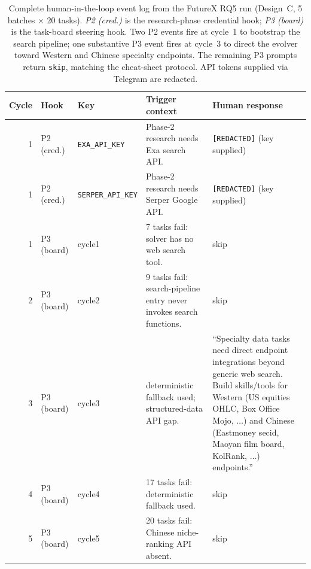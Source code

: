 \begin{table}[t]
\centering\footnotesize
\setlength{\tabcolsep}{4pt}
\caption{Complete human-in-the-loop event log from the FutureX RQ5 run (Design~C, 5 batches $\times$ 20 tasks). \emph{P2 (cred.)} is the research-phase credential hook; \emph{P3 (board)} is the task-board steering hook. Two P2 events fire at cycle~1 to bootstrap the search pipeline; one substantive P3 event fires at cycle~3 to direct the evolver toward Western and Chinese specialty endpoints. The remaining P3 prompts return \texttt{skip}, matching the cheat-sheet protocol. API tokens supplied via Telegram are redacted.}
\label{tab:hitl_log}
\renewcommand{\arraystretch}{1.15}
\begin{tabular}{@{}rllp{}p{}@{}}
\toprule
Cycle & Hook & Key & Trigger context & Human response \\
\midrule
1 & P2 (cred.) & \texttt{EXA\_API\_KEY} & Phase-2 research needs Exa search API. & \texttt{[REDACTED]} (key supplied) \\
1 & P2 (cred.) & \texttt{SERPER\_API\_KEY} & Phase-2 research needs Serper Google API. & \texttt{[REDACTED]} (key supplied) \\
1 & P3 (board) & cycle1 & 7 tasks fail: solver has no web search tool. & skip \\
2 & P3 (board) & cycle2 & 9 tasks fail: search-pipeline entry never invokes search functions. & skip \\
3 & P3 (board) & cycle3 & deterministic fallback used; structured-data API gap. & ``Specialty data tasks need direct endpoint integrations beyond generic web search. Build skills/tools for Western (US equities OHLC, Box Office Mojo, $\ldots$) and Chinese (Eastmoney secid, Maoyan film board, KolRank, $\ldots$) endpoints.'' \\
4 & P3 (board) & cycle4 & 17 tasks fail: deterministic fallback used. & skip \\
5 & P3 (board) & cycle5 & 20 tasks fail: Chinese niche-ranking API absent. & skip \\
\bottomrule
\end{tabular}
\end{table}
